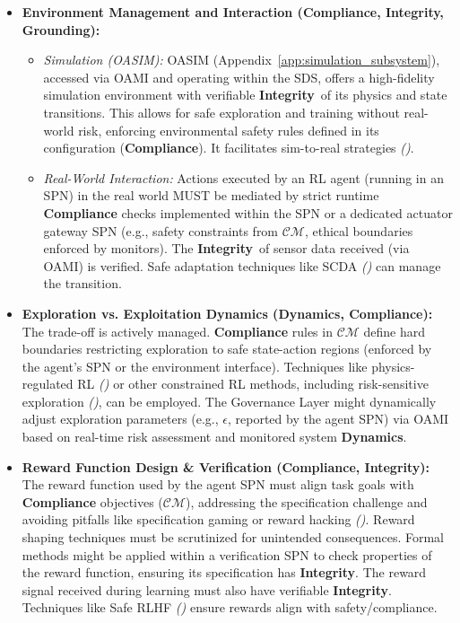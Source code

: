 \documentclass[12pt,a4paper]{report}
\renewcommand{\citep}[1]{\textit{\scriptsize{(\cite{#1})}}}
\newcommand{\Compliance}{\textbf{Compliance}}
\newcommand{\Integrity}{\textbf{Integrity}}
\newcommand{\Dynamics}{\textbf{Dynamics}}
\begin{document}
	\begin{itemize}
		\item \textbf{Environment Management and Interaction (\Compliance, Integrity, Grounding):}
		\begin{itemize}
			\item \textit{Simulation (OASIM):} OASIM (Appendix~\ref{app:simulation_subsystem}), accessed via OAMI and operating within the SDS, offers a high-fidelity simulation environment with verifiable \Integrity\ of its physics and state transitions. This allows for safe exploration and training without real-world risk, enforcing environmental safety rules defined in its configuration (\textbf{Compliance}). It facilitates sim-to-real strategies \citep{Josifovski_SCDA_2025, Li2025DigitalTwins}.
			\item \textit{Real-World Interaction:} Actions executed by an RL agent (running in an SPN) in the real world MUST be mediated by strict runtime \textbf{Compliance} checks implemented within the SPN or a dedicated actuator gateway SPN (e.g., safety constraints from $\mathcal{CM}$, ethical boundaries enforced by monitors). The \Integrity\ of sensor data received (via OAMI) is verified. Safe adaptation techniques like SCDA \citep{Josifovski_SCDA_2025} can manage the transition.
		\end{itemize}
		\item \textbf{Exploration vs. Exploitation Dynamics (\Dynamics, Compliance):} The trade-off is actively managed. \textbf{Compliance} rules in $\mathcal{CM}$ define hard boundaries restricting exploration to safe state-action regions (enforced by the agent's SPN or the environment interface). Techniques like physics-regulated RL \citep{Cao_PhyDRL_2024} or other constrained RL methods, including risk-sensitive exploration \citep{AdditionalCitationRef16}, can be employed. The Governance Layer might dynamically adjust exploration parameters (e.g., $\epsilon$, reported by the agent SPN) via OAMI based on real-time risk assessment and monitored system \Dynamics.
		\item \textbf{Reward Function Design \& Verification (\Compliance, Integrity):} The reward function used by the agent SPN must align task goals with \textbf{Compliance} objectives ($\mathcal{CM}$), addressing the specification challenge and avoiding pitfalls like specification gaming or reward hacking \citep{Kovac2025SpecGaming}. Reward shaping techniques must be scrutinized for unintended consequences. Formal methods might be applied within a verification SPN to check properties of the reward function, ensuring its specification has \Integrity. The reward signal received during learning must also have verifiable \Integrity. Techniques like Safe RLHF \citep{Dai_Safe_RLHF_2023} ensure rewards align with safety/compliance.

\end{itemize}
\end{document}
